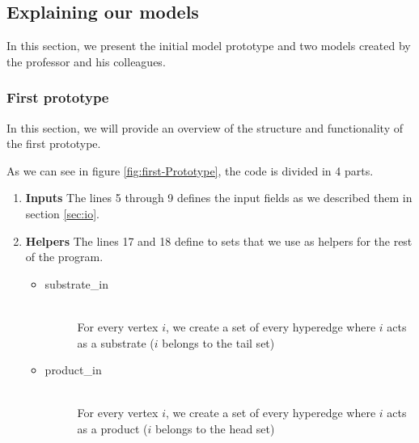 \subsection{Explaining our models}
In this section, we present the initial model prototype and two models created by the professor and his colleagues.
\subsubsection{First prototype} \label{sec:first_prototype}
In this section, we will provide an overview of the structure and functionality of the first prototype.

As we can see in figure \ref{fig:first-Prototype}, the code is divided in 4 parts.

\begin{enumerate}
    \item \textbf{Inputs} The lines 5 through 9 defines the input fields as we described them in section \ref{sec:io}.
    \item \textbf{Helpers} The lines 17 and 18 define to sets that we use as helpers for the rest of the program.
    \begin{itemize}
        \item
        \begin{description}
            \item[substrate\_in] ~\\ For every vertex $i$, we create a set of every hyperedge where $i$ acts as a substrate ($i$ belongs to the tail set)
        \end{description}
        \item
        \begin{description}
            \item[product\_in] ~\\ For every vertex $i$, we create a set of every hyperedge where $i$ acts as a product ($i$ belongs to the head set)
        \end{description}
    \end{itemize}
    

\end{enumerate}

